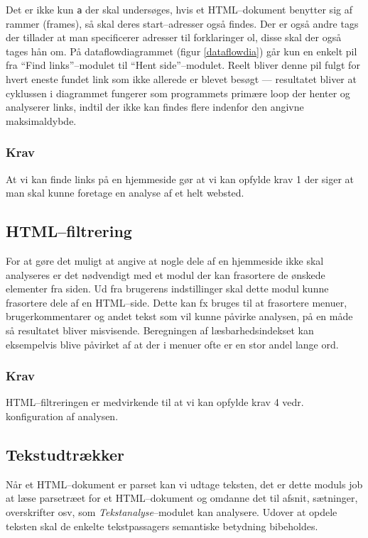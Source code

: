 \documentclass[a4paper,oneside]{memoir}
\begin{document}
Det er ikke kun \texttt{a} der skal undersøges, hvis et HTML--dokument
benytter sig af rammer (frames), så skal deres start--adresser også
findes. Der er også andre tags der tillader at man specificerer
adresser til forklaringer ol, disse skal der også tages hån om.
\label{cyklus}
  På dataflowdiagrammet (figur \ref{dataflowdia}) går kun en enkelt pil fra
``Find links''--modulet til ``Hent side''--modulet. Reelt bliver denne pil fulgt
for hvert eneste
fundet link som ikke allerede er blevet besøgt --- resultatet bliver at
cyklussen i diagrammet fungerer som programmets primære loop der
henter og analyserer links, indtil der ikke kan findes flere indenfor
den angivne maksimaldybde.

\subsubsection{Krav}
At vi kan finde links på en hjemmeside gør at vi kan opfylde krav 1
der siger at man skal kunne foretage en analyse af et helt websted.

\subsection{HTML--filtrering}
For at gøre det muligt at angive at nogle dele af en hjemmeside ikke
skal analyseres er det nødvendigt med et modul der kan frasortere de
ønskede elementer fra siden. Ud fra brugerens indstillinger skal dette
modul kunne frasortere dele af en HTML--side. Dette kan fx bruges
til at frasortere menuer, brugerkommentarer og andet tekst som vil
kunne påvirke analysen, på en måde så resultatet bliver
misvisende. Beregningen af læsbarhedsindekset kan eksempelvis blive
påvirket af at der i menuer ofte er en stor andel lange ord.

\subsubsection{Krav}
HTML--filtreringen er medvirkende til at vi kan opfylde krav 4
vedr. konfiguration af analysen.

\subsection{Tekstudtrækker}
\label{tekstudtraekkerdesign}
Når et HTML--dokument er parset kan vi udtage teksten, det er dette
moduls job at læse parsetræet for et HTML--dokument og omdanne det til
afsnit, sætninger, overskrifter osv, som \textit{Tekstanalyse}--modulet
kan analysere. Udover at opdele teksten skal de enkelte tekstpassagers
semantiske betydning bibeholdes.
\end{document}
